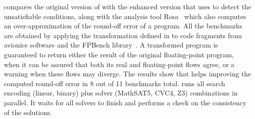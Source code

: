 \documentclass[runningheads,american,orivec,fleqn]{llncs}
\begin{document}
 compares the original version of \tool{} with the enhanced version that uses \smttool{} to detect the unsatisfiable conditions, along with the analysis tool Rosa~\cite{DarulovaK14} which also computes an over-approximation of the round-off error of a program.
%
All the benchmarks are obtained by applying the transformation defined in \cite{TitoloMFM18} to code fragments from avionics software and the FPBench library~\cite{DamoucheMPQST16}.
%
A transformed program is guaranteed to return either the result of the original floating-point program, when it can be assured that both its real and floating-point flows agree, or a warning when these flows may diverge.
% 
The results show that \smttool{} helps \tool{} improving the computed round-off error in 8 out of 11 benchmarks total.
% 
\smttool{} runs all search encoding (linear, binary) plus solver (MathSAT5, CVC4, Z3) combinations in parallel. It waits for all solvers to finish and performs a check on the consistency of the solutions.
% 
\end{document}
